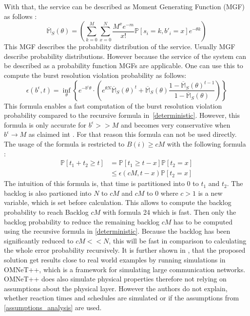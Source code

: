 \documentclass[conference]{IEEEtran}
\begin{document}
With that, the service can be described as Moment Generating Function (MGF) as follows \cite{8422323}:
\[\overline{\mathds{M}}_S(\theta) = \left(\sum_{k = 0}^{M}\sum_{x =0}^{N}\frac{M^xe^{-m}}{x!}\mathds{P}[s_i = k, b'_i = x]e^{-\theta k}  \right)\]
This MGF describes the probability distribution of the service. Usually MGF describe probability distributions. However because the service of the system can be described as a probability function MGFs are applicable.
One can use this to compute the burst resolution violation probability as follows:
\[\epsilon(b^\epsilon, t) = \inf_{\theta}\left\{e^{-b^\epsilon \theta} \cdot (e^{\theta N}\overline{\mathds{M}}_S(\theta)^t+\overline{\mathds{M}}_S(\theta)\frac{1-\overline{\mathds{M}}_S(\theta)^{t-1}}{1-\overline{\mathds{M}}_S(\theta)})\right\}\]
This formula enables a fast computation of the burst resolution violation probability compared to the recursive formula in~\ref{deterministic}.
However, this formula is only accurate for $b^\epsilon>>M$ and becomes very conservative when $b^\epsilon\rightarrow M$ as claimed int \cite{8422323}.
For that reason this formula can not be used directly.
The usage of the formula is restricted to $B(i) \geq cM$ with the following formula \cite{8422323}:
\begin{align*}
    \mathds{P}[t_1+t_2\geq t]&= \mathds{P}[t_1\geq t-x]\mathds{P}[t_2 = x]\\
    &\leq \epsilon(cM, t-x) \mathds{P}[t_2 = x]
\end{align*}
The intuition of this formula is, that time is partitioned into 0 to $t_1$ and $t_2$.
The backlog is also partioned into $N$ to $cM$ and $cM$ to $0$ where $c >1$ is a new variable, which is set before calculation.
This allows to compute the backlog probability to reach Backlog $cM$ with formula 24 which is fast.
Then only the backlog probability to reduce the remaining backlog $cM$ has to be computed using the recursive formula in \ref{deterministic}.
Because the backlog has been significantly reduced to $cM << N$, this will be fast in comparison to calculating the whole error probability recursively.
It is further shown in \cite{8422323}, that the proposed solution get results close to real world examples by running simulations in OMNeT++, which is a framework for simulating large communication networks.
OMNeT++ does also simulate physical properties therefore not relying on assumptions about the physical layer.
However the authors do not explain, whether reaction times and schedules are simulated or if the assumptions from \ref{assumptions_analysis} are used.
\end{document}
